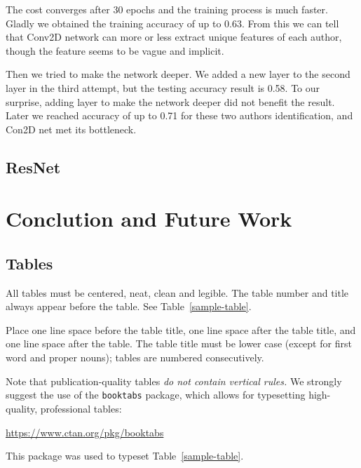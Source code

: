 \documentclass{article}
\begin{document}

The cost converges after 30 epochs and the training process is much faster. Gladly we obtained the training accuracy of up to 0.63. From this we can tell that Conv2D network can more or less  extract unique features of each author, though the feature seems to be vague and implicit.

Then we tried to make the network deeper. We added a new layer to the second layer in the third attempt, but the testing accuracy result is 0.58. To our surprise, adding layer to make the network deeper did not benefit the result. Later we reached accuracy of up to 0.71 for these two authors identification, and Con2D net met its bottleneck.



\subsection{ResNet}









\section{Conclution and Future Work}





\subsection{Tables}

All tables must be centered, neat, clean and legible.  The table
number and title always appear before the table.  See
Table~\ref{sample-table}.

Place one line space before the table title, one line space after the
table title, and one line space after the table. The table title must
be lower case (except for first word and proper nouns); tables are
numbered consecutively.

Note that publication-quality tables \emph{do not contain vertical
  rules.} We strongly suggest the use of the \verb+booktabs+ package,
which allows for typesetting high-quality, professional tables:
\begin{center}
  \url{https://www.ctan.org/pkg/booktabs}
\end{center}
This package was used to typeset Table~\ref{sample-table}.
\end{document}
